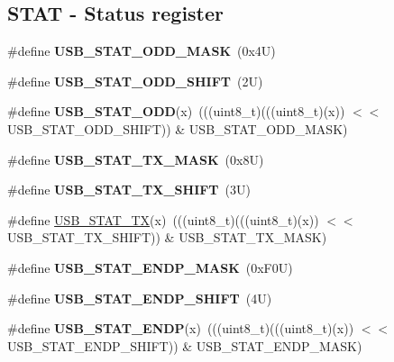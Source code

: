 \subsection*{S\+T\+AT -\/ Status register}
\begin{DoxyCompactItemize}
\item 
\mbox{\label{group___u_s_b___register___masks_ga49caa3c5b36fc89eadadd60cdf331643}} 
\#define {\bfseries U\+S\+B\+\_\+\+S\+T\+A\+T\+\_\+\+O\+D\+D\+\_\+\+M\+A\+SK}~(0x4\+U)
\item 
\mbox{\label{group___u_s_b___register___masks_ga15f3e2fa671ea1a59e0b24a9697faf8a}} 
\#define {\bfseries U\+S\+B\+\_\+\+S\+T\+A\+T\+\_\+\+O\+D\+D\+\_\+\+S\+H\+I\+FT}~(2\+U)
\item 
\mbox{\label{group___u_s_b___register___masks_gaf2435ac1190d60f8c1db948f6dd2a844}} 
\#define {\bfseries U\+S\+B\+\_\+\+S\+T\+A\+T\+\_\+\+O\+DD}(x)~(((uint8\+\_\+t)(((uint8\+\_\+t)(x)) $<$$<$ U\+S\+B\+\_\+\+S\+T\+A\+T\+\_\+\+O\+D\+D\+\_\+\+S\+H\+I\+FT)) \& U\+S\+B\+\_\+\+S\+T\+A\+T\+\_\+\+O\+D\+D\+\_\+\+M\+A\+SK)
\item 
\mbox{\label{group___u_s_b___register___masks_gab953f904ef3a2b838a922ebdf69cf140}} 
\#define {\bfseries U\+S\+B\+\_\+\+S\+T\+A\+T\+\_\+\+T\+X\+\_\+\+M\+A\+SK}~(0x8\+U)
\item 
\mbox{\label{group___u_s_b___register___masks_ga5173e8423017932d90919ddb18f918bd}} 
\#define {\bfseries U\+S\+B\+\_\+\+S\+T\+A\+T\+\_\+\+T\+X\+\_\+\+S\+H\+I\+FT}~(3\+U)
\item 
\#define \mbox{\hyperlink{group___u_s_b___register___masks_ga879e6d045ec05d5edcad4e05e091c568}{U\+S\+B\+\_\+\+S\+T\+A\+T\+\_\+\+TX}}(x)~(((uint8\+\_\+t)(((uint8\+\_\+t)(x)) $<$$<$ U\+S\+B\+\_\+\+S\+T\+A\+T\+\_\+\+T\+X\+\_\+\+S\+H\+I\+FT)) \& U\+S\+B\+\_\+\+S\+T\+A\+T\+\_\+\+T\+X\+\_\+\+M\+A\+SK)
\item 
\mbox{\label{group___u_s_b___register___masks_gad8a184e838de511e23aa32011fc9f0b6}} 
\#define {\bfseries U\+S\+B\+\_\+\+S\+T\+A\+T\+\_\+\+E\+N\+D\+P\+\_\+\+M\+A\+SK}~(0x\+F0\+U)
\item 
\mbox{\label{group___u_s_b___register___masks_ga5d85a4b028002bc9ce0f1650111cd49a}} 
\#define {\bfseries U\+S\+B\+\_\+\+S\+T\+A\+T\+\_\+\+E\+N\+D\+P\+\_\+\+S\+H\+I\+FT}~(4\+U)
\item 
\mbox{\label{group___u_s_b___register___masks_ga0302fe6637ae59174d7702947430dbba}} 
\#define {\bfseries U\+S\+B\+\_\+\+S\+T\+A\+T\+\_\+\+E\+N\+DP}(x)~(((uint8\+\_\+t)(((uint8\+\_\+t)(x)) $<$$<$ U\+S\+B\+\_\+\+S\+T\+A\+T\+\_\+\+E\+N\+D\+P\+\_\+\+S\+H\+I\+FT)) \& U\+S\+B\+\_\+\+S\+T\+A\+T\+\_\+\+E\+N\+D\+P\+\_\+\+M\+A\+SK)
\end{DoxyCompactItemize}
